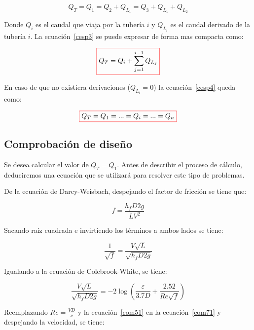 \documentclass[10pt, oneside]{article}
\begin{document}
\begin{itemize}
\begin{equation}
Q_T = Q_1 = Q_2 + Q_{L_1} = Q_3 + Q_{L_1} + Q_{L_2}
\label{cesp3}
\end{equation}

Donde $Q_i$ es el caudal que viaja por la tuber\'ia $i$ y $Q_{L_i}$ es el caudal derivado de la tuber\'ia $i$. La ecuaci\'on~\ref{cesp3} se puede expresar de forma mas compacta como:

\begin{equation}
\color{red}\boxed{\color{black} Q_T = Q_i + \sum_{j=1}^{i-1} Q_{L_j} }
\label{cesp4}
\end{equation}

En caso de que no existiera derivaciones ($Q_{L_i} = 0$) la ecuaci\'on~\ref{cesp4} queda como:

\begin{equation}
\color{red}\boxed{\color{black} Q_T = Q_1 = ...= Q_i = ...  = Q_n }
\label{cesp5}
\end{equation}

\end{itemize}

\subsection{Comprobaci\'on de dise\~no}
Se desea calcular el valor de $Q_T = Q_1$. Antes de describir el proceso de c\'alculo, deduciremos una ecuaci\'on que se utilizar\'a para resolver este tipo de problemas. 

De la ecuaci\'on de Darcy-Weisbach, despejando el factor de fricci\'on se tiene que:

\begin{equation}
f = \frac{h_f D 2g}{L V^2}
\label{com41}
\end{equation}

Sacando ra\'iz cuadrada e invirtiendo los t\'erminos a ambos lados se tiene:

\begin{equation}
\frac{1}{\sqrt{f}} = \frac{V\sqrt{L}}{\sqrt{h_f D 2g}}
\label{com51}
\end{equation}

Igualando a la ecuaci\'on de Colebrook-White, se tiene:

\begin{equation}
\frac{V\sqrt{L}}{\sqrt{h_f D 2g}}= -2 \log \left( \frac{\varepsilon}{3.7D} + \frac{2.52}{Re \sqrt{f}} \right) 
\label{com71}
\end{equation}

Reemplazando $Re = \frac{VD}{\nu}$ y la ecuaci\'on~\ref{com51} en la ecuaci\'on~\ref{com71} y despejando la velocidad, se tiene:
\end{document}
